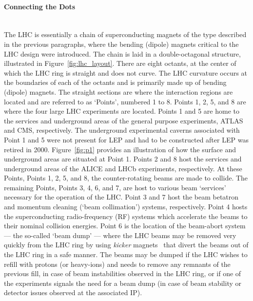 \paragraph{Connecting the Dots} \mbox{} \\
The LHC is essentially a chain of superconducting magnets of the type described in the previous paragraphs, where
the bending (dipole) magnets critical to the LHC design were introduced.
The chain is laid in a double-octagonal structure, illustrated in Figure~\ref{fig:lhc_layout}. There are eight
octants, at the center of which the LHC ring is straight and does not curve.
The LHC curvature occurs at the
boundaries of each of the octants and is primarily made up of bending (dipole) magnets.
The straight sections are where the interaction regions are located and are referred
to as `Points', numbered 1 to 8.
Points 1, 2, 5, and 8 are where the four large LHC experiments are located.
Points 1 and 5 are home to the services and underground areas
of the general purpose experiments, ATLAS and CMS, respectively.
The underground experimental caverns associated with Point 1 and 5 were not present for LEP and
had to be constructed after LEP was retired in 2000.
Figure~\ref{fig:p1} provides an illustration of how the surface and underground
areas are situated at Point 1.
Points 2 and 8 host the services and underground areas of the ALICE and LHCb experiments, respectively.
At these Points, Points 1, 2, 5, and 8, the counter-rotating beams are
made to collide. The remaining Points, Points 3, 4, 6, and 7, are host to various beam `services'
necessary for the operation of the LHC.
Point 3 and 7 host the beam betatron and momentum cleaning (`beam collimation') systems, respectively.
Point 4 hosts the superconducting radio-frequency (RF) systems which accelerate the beams to
their nominal collision energies.
Point 6 is the location of the beam-abort system --- the so-called `beam dump' --- where
the LHC beams may be removed very quickly from the LHC ring by using \textit{kicker} magnets~\cite{LHCDesignI}
that divert the beams out of the LHC ring in a safe manner. The beams may be dumped
if the LHC wishes to refill with protons (or heavy-ions) and needs to remove any
remnants of the previous fill, in case of beam instabilities observed in the LHC ring,
or if one of the experiments signals the need for a beam dump (in case of
beam stability or detector issues observed at the associated IP).

